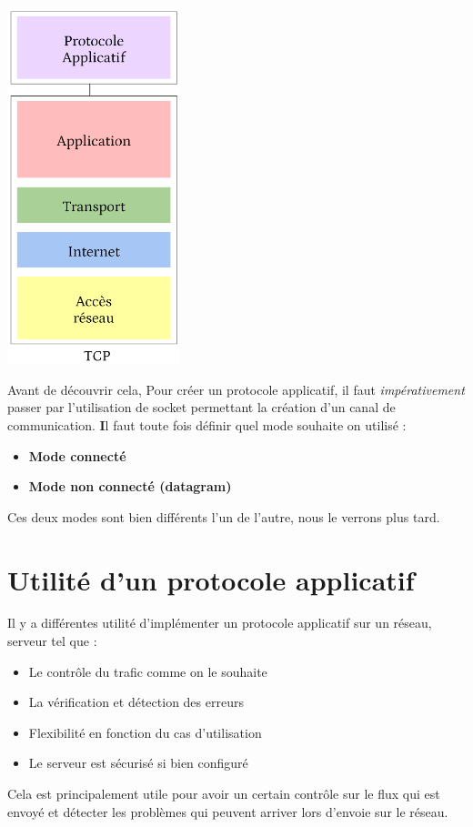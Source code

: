     {
    \centering
    \includegraphics[width=5cm]{figures/protocole-appli.png}
    \par
    }

Avant de découvrir cela, 
Pour créer un protocole applicatif, il faut \emph{impérativement} passer par l'utilisation de socket permettant la création d'un canal de communication. \textbf Il faut toute fois définir quel mode souhaite on utilisé :
\begin{itemize}
     \item \textbf{Mode connecté}
     \item \textbf{Mode non connecté (datagram)}
\end{itemize}

Ces deux modes sont bien différents l'un de l'autre, nous le verrons plus tard.

\section{Utilité d'un protocole applicatif}

Il y a différentes utilité d'implémenter un protocole applicatif sur un réseau, serveur tel que :
\begin{itemize}
     \item Le contrôle du trafic comme on le souhaite
     \item La vérification et détection des erreurs
     \item Flexibilité en fonction du cas d'utilisation
     \item Le serveur est sécurisé si bien configuré
\end{itemize}

Cela est principalement utile pour avoir un certain contrôle sur le flux qui est envoyé et détecter les problèmes qui peuvent arriver lors d'envoie sur le réseau.

